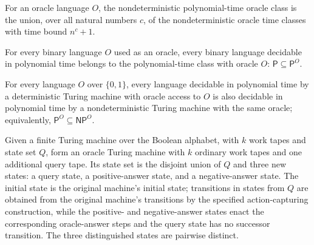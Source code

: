 \begin{definition}
\label{Complexity.NPOracle}
\leanok
{}
For an oracle language $O$, the nondeterministic polynomial-time oracle class is the
union, over all natural numbers $c$, of the nondeterministic oracle time classes with
time bound $n^c+1$.
\end{definition}

\begin{theorem}
\label{Complexity.P_subset_POracle}
\leanok
{}
For every binary language $O$ used as an oracle, every binary language decidable in
polynomial time belongs to the polynomial-time class with oracle $O$: $\mathsf{P}
\subseteq \mathsf{P}^{O}$.
\end{theorem}

\begin{theorem}
\label{Complexity.POracle_subset_NPOracle}
\leanok
{}
For every language $O$ over $\{0,1\}$, every language decidable in polynomial time by a
deterministic Turing machine with oracle access to $O$ is also decidable in polynomial
time by a nondeterministic Turing machine with the same oracle; equivalently,
$\mathsf{P}^O\subseteq\mathsf{NP}^O$.
\end{theorem}

\begin{definition}
\label{Complexity.queryTM}
\leanok
{}
Given a finite Turing machine over the Boolean alphabet, with $k$ work tapes and state
set $Q$, form an oracle Turing machine with $k$ ordinary work tapes and one additional
query tape. Its state set is the disjoint union of $Q$ and three new states: a query
state, a positive-answer state, and a negative-answer state. The initial state is the
original machine’s initial state; transitions in states from $Q$ are obtained from the
original machine’s transitions by the specified action-capturing construction, while the
positive- and negative-answer states enact the corresponding oracle-answer steps and the
query state has no successor transition. The three distinguished states are pairwise
distinct.
\end{definition}

